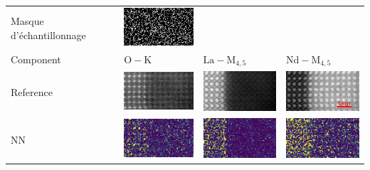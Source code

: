 \setlength{}

\begin{tabular}{m{2cm}*{3}{M{0.24\textwidth}}}
    Masque d'échantillonnage&
    \includegraphics[width=\tmplength]{img/chapitre4/figure9/img/mask.png}&
    &
    \\[30pt]
    Component&
    {$\mathrm{O-K}$}&
    {$\mathrm{La-M}_{4, 5}$}&
    {$\mathrm{Nd-M}_{4, 5}$}\\
    Reference&
    \includegraphics[width=\tmplength]{img/chapitre4/figure7/HR2_GT_band_0.png}&
    \includegraphics[width=\tmplength]{img/chapitre4/figure7/HR2_GT_band_1.png}&
    \includegraphics[width=\tmplength]{img/chapitre4/figure7/HR2_GT_band_2.png}\\
    NN&
    \includegraphics[width=\tmplength]{img/chapitre4/figure7/R2_NN_band_0.png}&
    \includegraphics[width=\tmplength]{img/chapitre4/figure7/R2_NN_band_1.png}&
    \includegraphics[width=\tmplength]{img/chapitre4/figure7/R2_NN_band_2.png}\\

\end{tabular}
